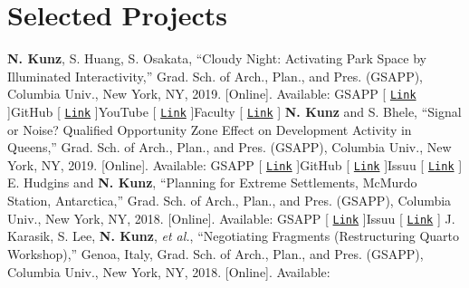 \documentclass{article}
\begin{document}
\section*{Selected Projects}
        \textbf{N. Kunz}, S. Huang, S. Osakata, ``Cloudy Night: Activating Park Space by Illuminated Interactivity,'' Grad. Sch. of Arch., Plan., and Pres. (GSAPP), Columbia Univ., New York, NY, 2019. [Online]. Available:\newline\newline
        \faTrain\space GSAPP [ \href{https://www.arch.columbia.edu/student-work/7502-cloudy-night}{\texttt{Link}} ]\space\faGithub\space GitHub [ \href{https://github.com/nickkunz/cloudynight}{\texttt{Link}} ]\space\space \faYoutube\space YouTube [ \href{https://www.youtube.com/watch?v=GWaXrN79Lbw&feature=emb_title}{\texttt{Link}} ]\space\faCertificate\space Faculty [ \href{https://edblogs.columbia.edu/plana6102-001-2019-1/2019/05/10/cloudy-night-activating-park-space-by-illuminated-interactivity-2/}{\texttt{Link}} ]\newline\newline
        \textbf{N. Kunz} and S. Bhele, ``Signal or Noise? Qualified Opportunity Zone Effect on Development Activity in Queens,'' Grad. Sch. of Arch., Plan., and Pres. (GSAPP), Columbia Univ., New York, NY, 2019. [Online]. Available:\newline\newline
        \faTrain\space GSAPP [ \href{https://cdn.filepicker.io/api/file/guXiVLU6QreQgKPPPUG8?&fit=max}{\texttt{Link}} ]\space\faGithub\space GitHub [ \href{https://github.com/nickkunz/queens-dbscan}{\texttt{Link}} ]\space\faBook\space Issuu [ \href{https://issuu.com/nickkunz/docs/queens_report}{\texttt{Link}} ]\newline\newline
        E. Hudgins and \textbf{N. Kunz}, ``Planning for Extreme Settlements, McMurdo Station, Antarctica,'' Grad. Sch. of Arch., Plan., and Pres. (GSAPP), Columbia Univ., New York, NY, 2018. [Online]. Available:\newline\newline
        \faTrain\space GSAPP [ \href{https://www.arch.columbia.edu/student-work/5461}{\texttt{Link}} ]\space\faBook\space Issuu [ \href{https://issuu.com/nickkunz/docs/mcmurdo}{\texttt{Link}} ]\newline\newline
        J. Karasik, S. Lee, \textbf{N. Kunz}, \textit{et al.}, ``Negotiating Fragments (Restructuring Quarto Workshop),'' Genoa, Italy, Grad. Sch. of Arch., Plan., and Pres. (GSAPP), Columbia Univ., New York, NY, 2018. [Online]. Available:\newline\newline
\end{document}
